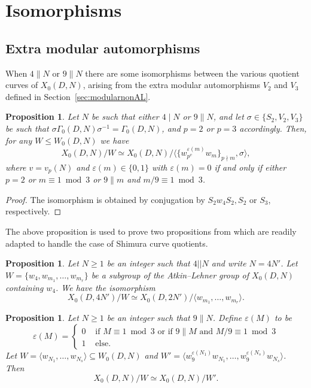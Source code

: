 \documentclass[12pt]{amsart}
\numberwithin{equation}{subsection}
\theoremstyle{plain}\newtheorem{ithm}{Theorem}
\theoremstyle{plain}\newtheorem{iprop}[ithm]{Proposition}
\newtheorem{proposition}[equation]{Proposition}
\theoremstyle{definition}
\theoremstyle{remark}
\newcommand{\Curve}[2]{X_0({#1},{#2})} %
\newcommand{\ALfull}[2]{W_0({#1},{#2})} %
\begin{document}
\section{Isomorphisms}
\label{sec:isomorphism}
\subsection{Extra modular automorphisms}

When $4 \parallel N$ or $9 \parallel N$ there are  some isomorphisms between the various quotient curves of $\Curve{D}{N}$, arising from the extra modular automorphisms $V_2$ and $V_3$ defined in Section~\ref{sec:modularnonAL}.

\begin{proposition}
    Let $N$ be such that either $4 \mid N$ or $9 \parallel N$, and let $\sigma \in \{ S_2, V_2, V_3 \}$ be such that $\sigma \Gamma_0(D,N) \sigma^{-1} = \Gamma_0(D,N)$, and $p = 2$ or $p = 3$ accordingly. Then, for any $W \le \ALfull{D}{N}$ we have
    $$
    \Curve{D}{N} / W \simeq \Curve{D}{N} / \langle \{ w_{p^v}^{\varepsilon(m)} w_m \}_{p \nmid m}, \sigma \rangle,
    $$
    where $v = v_p(N)$ and $\varepsilon(m) \in \{0,1\}$ with $\varepsilon(m) = 0$ if and only if either $p = 2$ or $m \equiv 1 \bmod 3$ or $9 \parallel m$ and $m/9 \equiv 1 \bmod 3$.
\end{proposition}

\begin{proof}
    The isomorphism is obtained by conjugation by $S_2 w_4 S_2, S_2$ or $S_3$, respectively.
\end{proof}

The above proposition is used to prove two propositions from \cite[Section 3]{FH99} which are readily adapted to handle the case of Shimura curve quotients.

\begin{proposition}
\label{prop:iso4}
    Let $N \geq 1$ be an integer such that $4 || N$ and write $N = 4N'$. Let $W = \{ w_4,  w_{m_1}, \dots, w_{m_r}\}$ be a subgroup of the Atkin--Lehner group of $\Curve{D}{N}$ containing $w_4$. We have the isomorphism
    \[\Curve{D}{4N'}/W 
\simeq \Curve{D}{2N'}/ \langle w_{m_1}, \dots, w_{m_r}\rangle. \]
\end{proposition}


\begin{proposition}
\label{prop:iso9}
Let $N \geq 1$ be an integer such that $9 \parallel N$.
Define $\varepsilon(M)$ to be
\[
\varepsilon(M) =
\begin{cases}
0 & \text{ if } M \equiv 1 \bmod 3 \text{ or if } 9 \parallel M \text{ and }  M/9  \equiv 1 \bmod 3 \\
1 & \text{ else.}
\end{cases}
\]
Let $W = \langle w_{N_1}, \dots , w_{N_s} \rangle \subseteq \ALfull{D}{N}$ and 
$W' = \langle w_9^{\varepsilon(N_1)} w_{N_1}, \dots , w_9^{\varepsilon(N_s)}w_{N_s}\rangle $.
Then \[ \Curve{D}{N}/W \simeq \Curve{D}{N}/W'.\]
\end{proposition}
\end{document}
